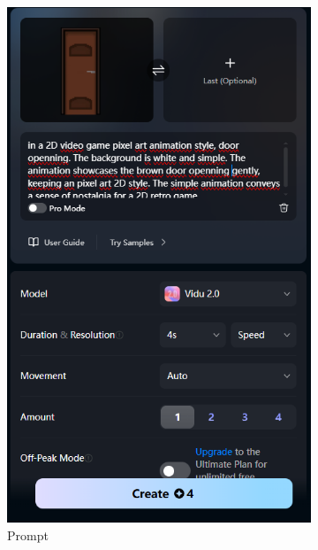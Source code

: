 \begin{figure}[htbp]
    \centering
    \caption{\small Animação da porta marrom pela funcionalidade Imagem para vídeo no Vidu }
    \label{fig:vidu15}
    \begin{subfigure}{0.35\linewidth}
        \includegraphics[width=1\linewidth]{figs/vidu/tela15.PNG}
        \caption{\small Prompt}
        \label{fig:vidu15a}
    \end{subfigure}
    \begin{subfigure}{0.35\linewidth}

\end{subfigure}
\end{figure}
